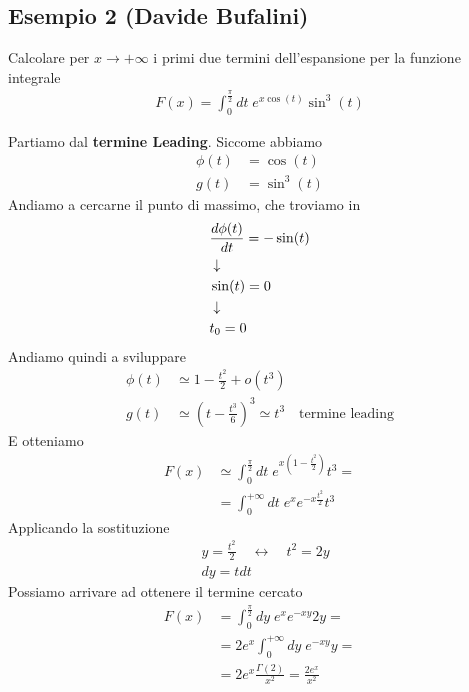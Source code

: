 \newpage

\subsection{Esempio 2 (Davide Bufalini) \label{es1}}

Calcolare per $x\rightarrow +\infty$ i primi due termini dell'espansione per la funzione integrale
\begin{align}
	F(x) = \int_{0}^{\frac{\pi}{2}} dt \; e^{x\cos(t)}\sin^3(t)
\end{align}

Partiamo dal \textbf{termine Leading}. Siccome abbiamo
\begin{align}
	\phi(t) &= \cos(t) \\
	g(t) &= \sin^3(t)
\end{align}
Andiamo a cercarne il punto di massimo, che troviamo in
\begin{align}
	&\frac{d \phi(t)}{dt} = -\sin(t) \\ &\downarrow \nonumber \\
	&\sin(t) = 0 \nonumber \\ &\downarrow \nonumber \\
	&t_0=0
\end{align}
Andiamo quindi a sviluppare
\begin{align}
	\phi(t) &\simeq 1- \frac{t^2}{2} + o(t^3)  \\
	g(t) &\simeq \left( t - \frac{t^3}{6} \right)^3 \simeq t^3 \quad \text{termine leading}
\end{align}
E otteniamo
\begin{align}
	F(x) &\simeq \int_{0}^{\frac{\pi}{2}} dt \; e^{x\left(1- \frac{t^2}{2}\right)}t^3 = \nonumber\\
	&= \int_{0}^{+\infty} dt \; e^x e^{-x\frac{t^2}{2}}t^3
\end{align}
Applicando la sostituzione
\begin{align}
	&y= \frac{t^2}{2} \quad \leftrightarrow \quad t^2 = 2y \\
	&dy = tdt
\end{align}
Possiamo arrivare ad ottenere il termine cercato
\begin{align}
	F(x) &= \int_{0}^{\frac{\pi}{2}} dy \; e^x e^{-xy}2y = \nonumber\\
		 &= 2e^x\int_{0}^{+\infty} dy \;e^{-xy}y = \nonumber\\
		 &= 2e^x \frac{\Gamma(2)}{x^2} = \frac{2e^x}{x^2}
\end{align}

